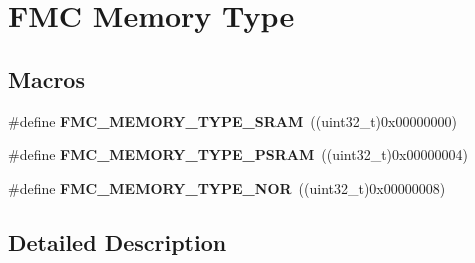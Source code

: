 \hypertarget{group___f_m_c___memory___type}{}\section{F\+MC Memory Type}
\label{group___f_m_c___memory___type}
\subsection*{Macros}
\begin{DoxyCompactItemize}
\item 
\#define {\bfseries F\+M\+C\+\_\+\+M\+E\+M\+O\+R\+Y\+\_\+\+T\+Y\+P\+E\+\_\+\+S\+R\+AM}~((uint32\+\_\+t)0x00000000)\hypertarget{group___f_m_c___memory___type_gadfa4983431ac691268cdb7c639d2b3af}{}\label{group___f_m_c___memory___type_gadfa4983431ac691268cdb7c639d2b3af}

\item 
\#define {\bfseries F\+M\+C\+\_\+\+M\+E\+M\+O\+R\+Y\+\_\+\+T\+Y\+P\+E\+\_\+\+P\+S\+R\+AM}~((uint32\+\_\+t)0x00000004)\hypertarget{group___f_m_c___memory___type_ga0da8ea1853bd5ef7e3adf05f12741ef2}{}\label{group___f_m_c___memory___type_ga0da8ea1853bd5ef7e3adf05f12741ef2}

\item 
\#define {\bfseries F\+M\+C\+\_\+\+M\+E\+M\+O\+R\+Y\+\_\+\+T\+Y\+P\+E\+\_\+\+N\+OR}~((uint32\+\_\+t)0x00000008)\hypertarget{group___f_m_c___memory___type_ga09cccfa7eb21563c0573214113a64ab5}{}\label{group___f_m_c___memory___type_ga09cccfa7eb21563c0573214113a64ab5}

\end{DoxyCompactItemize}


\subsection{Detailed Description}

